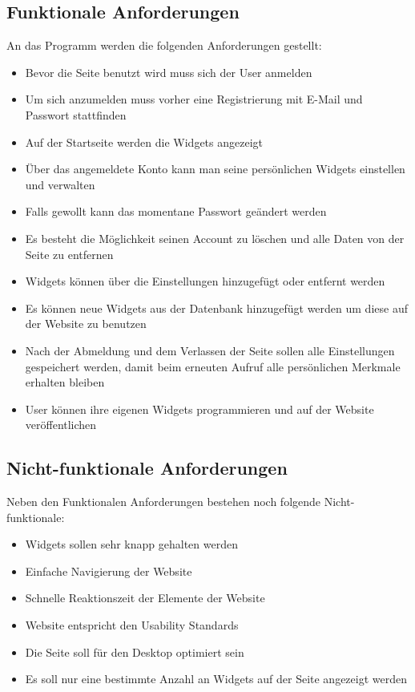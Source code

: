 	\subsection{Funktionale Anforderungen}
		An das Programm werden die folgenden Anforderungen gestellt: 
		\begin{itemize}
			\item Bevor die Seite benutzt wird muss sich der User anmelden 
			\item Um sich anzumelden muss vorher eine Registrierung mit E-Mail und Passwort stattfinden  
			\item Auf der Startseite werden die Widgets angezeigt
			\item Über das angemeldete Konto kann man seine persönlichen Widgets einstellen und verwalten
			\item Falls gewollt kann das momentane Passwort geändert werden
			\item Es besteht die Möglichkeit seinen Account zu löschen und alle Daten von der Seite zu entfernen 
			\item Widgets können über die Einstellungen hinzugefügt oder entfernt werden
			\item Es können neue Widgets aus der Datenbank hinzugefügt werden um diese auf der Website zu benutzen 
			\item Nach der Abmeldung und dem Verlassen der Seite sollen alle Einstellungen gespeichert werden, damit beim erneuten Aufruf alle persönlichen Merkmale erhalten bleiben   
			\item User können ihre eigenen Widgets programmieren und auf der Website veröffentlichen    
		\end{itemize}
	
	\subsection{Nicht-funktionale Anforderungen}
		Neben den Funktionalen Anforderungen bestehen noch folgende Nicht-funktionale:
		\begin{itemize}
			\item Widgets sollen sehr knapp gehalten werden
			\item Einfache Navigierung der Website
			\item Schnelle Reaktionszeit der Elemente der Website
			\item Website entspricht den Usability Standards
			\item Die Seite soll für den Desktop optimiert sein
			\item Es soll nur eine bestimmte Anzahl an Widgets auf der Seite angezeigt werden
		\end{itemize}
	
